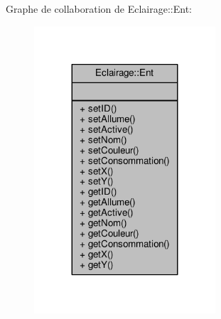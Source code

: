 Graphe de collaboration de Eclairage\+:\+:Ent\+:\nopagebreak
\begin{figure}[H]
\begin{center}
\leavevmode
\includegraphics[width=191pt]{classEclairage_1_1Ent__coll__graph}
\end{center}
\end{figure}
